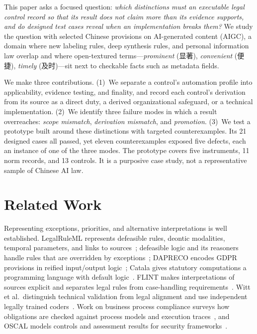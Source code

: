 \documentclass[sigconf,review,anonymous]{acmart}
\begin{document}
This paper asks a focused question: \emph{which distinctions must an executable legal control record so that its result does not claim more than its evidence supports, and do designed test cases reveal when an implementation breaks them?} We study the question with selected Chinese provisions on AI-generated content (AIGC), a domain where new labeling rules, deep synthesis rules, and personal information law overlap and where open-textured terms---\emph{prominent} (显著), \emph{convenient} (便捷), \emph{timely} (及时)---sit next to checkable facts such as metadata fields.

We make three contributions. (1)~We separate a control's automation profile into applicability, evidence testing, and finality, and record each control's derivation from its source as a direct duty, a derived organizational safeguard, or a technical implementation. (2)~We identify three failure modes in which a result overreaches: \emph{scope mismatch}, \emph{derivation mismatch}, and \emph{promotion}. (3)~We test a prototype built around these distinctions with targeted counterexamples. Its 21 designed cases all passed, yet eleven counterexamples exposed five defects, each an instance of one of the three modes. The prototype covers five instruments, 11 norm records, and 13 controls. It is a purposive case study, not a representative sample of Chinese AI law.

\section{Related Work}

Representing exceptions, priorities, and alternative interpretations is well established. LegalRuleML represents defeasible rules, deontic modalities, temporal parameters, and links to sources~\cite{legalRuleMl2021}; defeasible logic and its reasoners handle rules that are overridden by exceptions~\cite{prakken1997logical,lam2009spindle}; DAPRECO encodes GDPR provisions in reified input/output logic~\cite{robaldo2020dapreco}; Catala gives statutory computations a programming language with default logic~\cite{merigoux2021catala}. FLINT makes interpretations of sources explicit and separates legal rules from case-handling requirements~\cite{doesburg2019aliens}. Witt et al.\ distinguish technical validation from legal alignment and use independent legally trained coders~\cite{witt2024encoding}. Work on business process compliance surveys how obligations are checked against process models and execution traces~\cite{hashmi2018compliance,francesconi2023patterns}, and OSCAL models controls and assessment results for security frameworks~\cite{nistOscal}.
\end{document}
